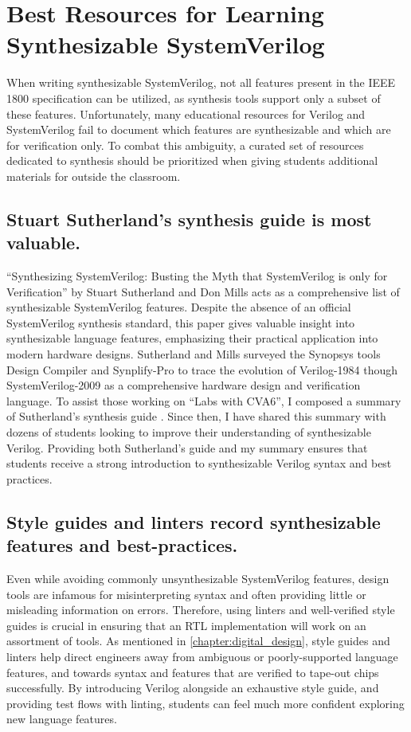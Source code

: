 
\chapter{Best Resources for Learning Synthesizable SystemVerilog}
\label{chapter:resources}

When writing synthesizable SystemVerilog, not all features present in the IEEE 1800 specification can be utilized, as synthesis tools support only a subset of these features. Unfortunately, many educational resources for Verilog and SystemVerilog fail to document which features are synthesizable and which are for verification only. To combat this ambiguity, a curated set of resources dedicated to synthesis should be prioritized when giving students additional materials for outside the classroom.

\section{Stuart Sutherland's synthesis guide is most valuable.}

``Synthesizing SystemVerilog: Busting the Myth that SystemVerilog is only for Verification'' by Stuart Sutherland and Don Mills acts as a comprehensive list of synthesizable SystemVerilog features. Despite the absence of an official SystemVerilog synthesis standard, this paper gives valuable insight into synthesizable language features, emphasizing their practical application into modern hardware designs. Sutherland and Mills surveyed the Synopsys tools Design Compiler and Synplify-Pro to trace the evolution of Verilog-1984 though SystemVerilog-2009 as a comprehensive hardware design and verification language. To assist those working on ``Labs with CVA6'', I composed a summary of Sutherland's synthesis guide \cite{labsWithCVA6}. Since then, I have shared this summary with dozens of students looking to improve their understanding of synthesizable Verilog. Providing both Sutherland's guide and my summary ensures that students receive a strong introduction to synthesizable Verilog syntax and best practices.

\section{Style guides and linters record synthesizable features and best-practices.}
\label{section:style_guides}

Even while avoiding commonly unsynthesizable SystemVerilog features, design tools are infamous for misinterpreting syntax and often providing little or misleading information on errors. Therefore, using linters and well-verified style guides is crucial in ensuring that an RTL implementation will work on an assortment of tools. As mentioned in \autoref{chapter:digital_design}, style guides and linters help direct engineers away from ambiguous or poorly-supported language features, and towards syntax and features that are verified to tape-out chips successfully. By introducing Verilog alongside an exhaustive style guide, and providing test flows with linting, students can feel much more confident exploring new language features.

